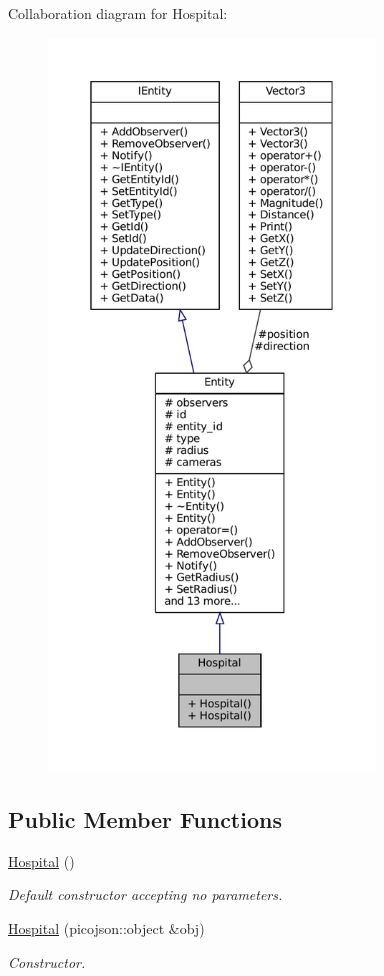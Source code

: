 Collaboration diagram for Hospital\+:\nopagebreak
\begin{figure}[H]
\begin{center}
\leavevmode
\includegraphics[height=550pt]{classHospital__coll__graph}
\end{center}
\end{figure}
\subsection*{Public Member Functions}
\begin{DoxyCompactItemize}
\item 
\mbox{\label{classHospital_a130b3a6c6e3dd35443437e1f5144b1ac}} 
\hyperlink{classHospital_a130b3a6c6e3dd35443437e1f5144b1ac}{Hospital} ()
\begin{DoxyCompactList}\small\item\em Default constructor accepting no parameters. \end{DoxyCompactList}\item 
\hyperlink{classHospital_aebc8b47c3d12ea7fc500981d89341e82}{Hospital} (picojson\+::object \&obj)
\begin{DoxyCompactList}\small\item\em Constructor. \end{DoxyCompactList}\end{DoxyCompactItemize}
